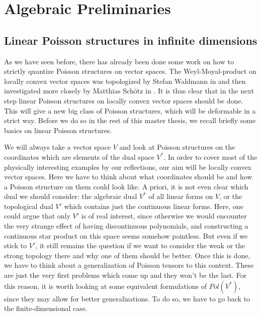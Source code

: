 
%
%

\chapter{Algebraic Preliminaries}


\section{Linear Poisson structures in infinite dimensions}
\label{sec:chap3_LinearPoisson}

As we have seen before, there has already been done some work on how to 
strictly quantize Poisson structures on vector spaces. The Weyl-Moyal-product 
on locally convex vector spaces was topologized by Stefan Waldmann in 
\cite{Wladmann:2004:Nuclear} and then investigated more closely by Matthias 
Schötz in \cite{Schoetz:Master}. It is thus clear that in the next step 
linear Poisson structures on locally convex vector spaces should be done. This 
will give a new big class of Poisson structures, which will be deformable in a 
strict way. Before we do so in the rest of this master thesis, we recall 
briefly some basics on linear Poisson structures.


We will always take a vector space $V$ and look at Poisson structures on the 
coordinates which are elements of the dual space $V^*$. In order to cover most 
of the physically interesting examples by our reflections, our aim will be 
locally convex vector spaces. Here we have to think about what coordinates 
should be and how a Poisson structure on them could look like. A priori, it is 
not even clear which dual we should consider: the algebraic dual $V^*$ of all 
linear forms on $V$, or the topological dual $V'$ which contains just the 
continuous linear forms. Here, one could argue that only $V'$ is of real 
interest, since otherwise we would encounter the very strange effect of having 
discontinuous polynomials, and constructing a continuous star product on this 
space seems somehow pointless. But even if we stick to $V'$, it still remains 
the question if we want to consider the weak or the strong topology there and 
why one of them should be better. Once this is done, we have to think about a 
generalization of Poisson tensors to this context. These are just the very 
first problems which come up and they won't be the last. For this reason, it 
is worth looking at some equivalent formulations of $Pol(V^*)$, since they 
may allow for better generalizations. To do so, we have to go back to the 
finite-dimensional case.

